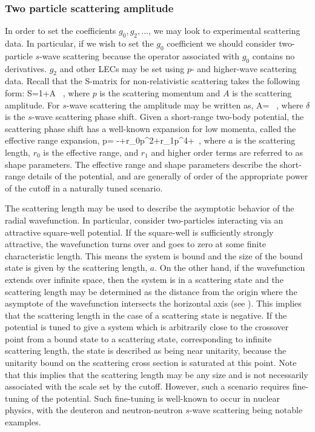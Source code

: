 \subsubsection{\label{sec:scatamp}Two particle scattering amplitude}
In order to set the coefficients $g_0, g_2, \ldots$, we may look to experimental scattering data. In particular, if we wish to set the $g_0$ coefficient we should consider two-particle $s$-wave scattering because the operator associated with $g_0$ contains no derivatives. $g_2$ and other LECs may be set using $p$- and higher-wave scattering data. Recall that the S-matrix for non-relativistic scattering takes the following form:
\beq
S=1+A \ ,
\eeq
where $p$ is the scattering momentum and $A$ is the scattering amplitude. For $s$-wave scattering the amplitude may be written as,
\beq
\label{eq:Apcotd}
A=  \ ,
\eeq
where $\delta$ is the $s$-wave scattering phase shift. Given a short-range two-body potential, the scattering phase shift has a well-known expansion for low momenta, called the effective range expansion,
\beq
\label{eq:ere}
p\cot\delta = -+r_0p^2+r_1p^4+\cdots \ ,
\eeq
where $a$ is the scattering length, $r_0$ is the effective range, and $r_1$ and higher order terms are referred to as shape parameters. The effective range and shape parameters describe the short-range details of the potential, and are generally of order of the appropriate power of the cutoff in a naturally tuned scenario. 

The scattering length may be used to describe the asymptotic behavior of the radial wavefunction. In particular, consider two-particles interacting via an attractive square-well potential. If the square-well is sufficiently strongly attractive, the wavefunction turns over and goes to zero at some finite characteristic length. This means the system is bound and the size of the bound state is given by the scattering length, $a$. On the other hand, if the wavefunction extends over infinite space, then the system is in a scattering state and the scattering length may be determined as the distance from the origin where the asymptote of the wavefunction intersects the horizontal axis (see ). This implies that the scattering length in the case of a scattering state is negative. If the potential is tuned to give a system which is arbitrarily close to the crossover point from a bound state to a scattering state, corresponding to infinite scattering length, the state is described as being near unitarity, because the unitarity bound on the scattering cross section is saturated at this point. Note that this implies that the scattering length may be any size and is not necessarily associated with the scale set by the cutoff. However, such a scenario requires fine-tuning of the potential. Such fine-tuning is well-known to occur in nuclear physics, with the deuteron and neutron-neutron $s$-wave scattering being notable examples.

